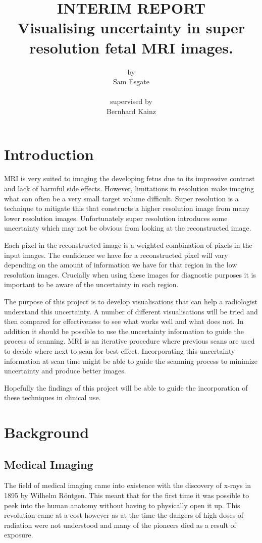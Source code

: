 \documentclass[
  oneside,
  11pt, a4paper,
  footinclude=true,
  headinclude=true,
  cleardoublepage=empty
]{scrbook}
\title{INTERIM REPORT\\Visualising uncertainty in super resolution fetal MRI images.}
\author{by\\Sam Esgate\\\\supervised by\\Bernhard Kainz}
\begin{document}
\maketitle



\chapter{Introduction}
MRI is very suited to imaging the developing fetus due to its impressive contrast and lack of harmful side effects. However, limitations in resolution make imaging what can often be a very small target volume difficult. Super resolution is a technique to mitigate this that constructs a higher resolution image from many lower resolution images. Unfortunately super resolution introduces some uncertainty which may not be obvious from looking at the reconstructed image.

Each pixel in the reconstructed image is a weighted combination of pixels in the input images. The confidence we have for a reconstructed pixel will vary depending on the amount of information we have for that region in the low resolution images. Crucially when using these images for diagnostic purposes it is important to be aware of the uncertainty in each region.

The purpose of this project is to develop visualisations that can help a radiologist understand this uncertainty. A number of different visualisations will be tried and then compared for effectiveness to see what works well and what does not. In addition it should be possible to use the uncertainty information to guide the process of scanning. MRI is an iterative procedure where previous scans are used to decide where next to scan for best effect. Incorporating this uncertainty information at scan time might be able to guide the scanning process to minimize uncertainty and produce better images.

Hopefully the findings of this project will be able to guide the incorporation of these techniques in clinical use.

\chapter{Background}

\section{Medical Imaging}
The field of medical imaging came into existence with the discovery of x-rays in 1895 by Wilhelm R\"{o}ntgen\cite{rontgen}. This meant that for the first time it was possible to peek into the human anatomy without having to physically open it up. This revolution came at a cost however as at the time the dangers of high doses of radiation were not understood and many of the pioneers died as a result of exposure\cite{xraydeath}.
\end{document}
